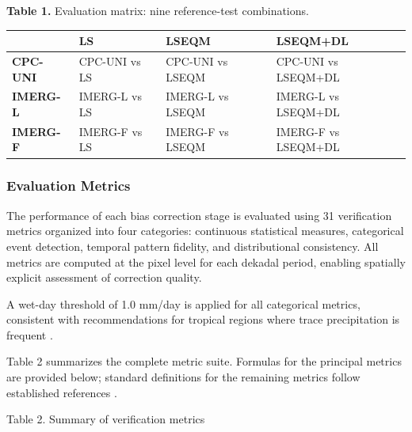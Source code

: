 \documentclass[remotesensing,article,submit,pdftex,moreauthors]{Definitions/mdpi}
\begin{document}
\textbf{Table 1.} Evaluation matrix: nine reference-test combinations.

\begin{longtable}[]{@{}llll@{}}
\toprule\noalign{}
& \textbf{LS} & \textbf{LSEQM} & \textbf{LSEQM+DL} \\
\midrule\noalign{}
\endhead
\bottomrule\noalign{}
\endlastfoot
\textbf{CPC-UNI} & CPC-UNI vs LS & CPC-UNI vs LSEQM & CPC-UNI vs
LSEQM+DL \\
\textbf{IMERG-L} & IMERG-L vs LS & IMERG-L vs LSEQM & IMERG-L vs
LSEQM+DL \\
\textbf{IMERG-F} & IMERG-F vs LS & IMERG-F vs LSEQM & IMERG-F vs
LSEQM+DL \\
\end{longtable}

\subsubsection{Evaluation Metrics}\label{evaluation-metrics}

The performance of each bias correction stage is evaluated using 31
verification metrics organized into four categories: continuous
statistical measures, categorical event detection, temporal pattern
fidelity, and distributional consistency. All metrics are computed at
the pixel level for each dekadal period, enabling spatially explicit
assessment of correction quality.

A wet-day threshold of 1.0 mm/day is applied for all categorical
metrics, consistent with recommendations for tropical regions where
trace precipitation is frequent \cite{ref24}.

Table 2 summarizes the complete metric suite. Formulas for the principal
metrics are provided below; standard definitions for the remaining
metrics follow established references \cite{ref14,ref15}.

Table 2. Summary of verification metrics
\end{document}
